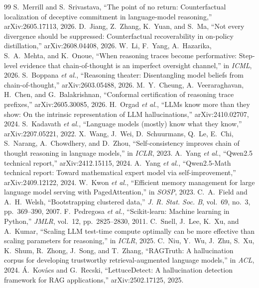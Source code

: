 \begin{thebibliography}{99}
 S.~Merrill and S.~Srivastava, ``The point of no return: Counterfactual localization of deceptive commitment in language-model reasoning,'' arXiv:2605.17113, 2026.
 D.~Jiang, Z.~Zhang, K.~Yuan, and S.~Ma, ``Not every divergence should be suppressed: Counterfactual recoverability in on-policy distillation,'' arXiv:2608.04408, 2026.
 W.~Li, F.~Yang, A.~Hazarika, S.~A.~Mehta, and K.~Onoue, ``When reasoning traces become performative: Step-level evidence that chain-of-thought is an imperfect oversight channel,'' in \emph{ICML}, 2026.
 S.~Boppana \emph{et al.}, ``Reasoning theater: Disentangling model beliefs from chain-of-thought,'' arXiv:2603.05488, 2026.
 M.~Y.~Cheung, A.~Veeraraghavan, H.~Chen, and G.~Balakrishnan, ``Conformal certification of reasoning trace prefixes,'' arXiv:2605.30085, 2026.
 H.~Orgad \emph{et al.}, ``LLMs know more than they show: On the intrinsic representation of LLM hallucinations,'' arXiv:2410.02707, 2024.
 S.~Kadavath \emph{et al.}, ``Language models (mostly) know what they know,'' arXiv:2207.05221, 2022.
 X.~Wang, J.~Wei, D.~Schuurmans, Q.~Le, E.~Chi, S.~Narang, A.~Chowdhery, and D.~Zhou, ``Self-consistency improves chain of thought reasoning in language models,'' in \emph{ICLR}, 2023.
 A.~Yang \emph{et al.}, ``Qwen2.5 technical report,'' arXiv:2412.15115, 2024.
 A.~Yang \emph{et al.}, ``Qwen2.5-Math technical report: Toward mathematical expert model via self-improvement,'' arXiv:2409.12122, 2024.
 W.~Kwon \emph{et al.}, ``Efficient memory management for large language model serving with PagedAttention,'' in \emph{SOSP}, 2023.
 C.~A.~Field and A.~H.~Welsh, ``Bootstrapping clustered data,'' \emph{J. R. Stat. Soc. B}, vol.~69, no.~3, pp.~369--390, 2007.
 F.~Pedregosa \emph{et al.}, ``Scikit-learn: Machine learning in Python,'' \emph{JMLR}, vol.~12, pp.~2825--2830, 2011.
 C.~Snell, J.~Lee, K.~Xu, and A.~Kumar, ``Scaling LLM test-time compute optimally can be more effective than scaling parameters for reasoning,'' in \emph{ICLR}, 2025.
 C.~Niu, Y.~Wu, J.~Zhu, S.~Xu, K.~Shum, R.~Zhong, J.~Song, and T.~Zhang, ``RAGTruth: A hallucination corpus for developing trustworthy retrieval-augmented language models,'' in \emph{ACL}, 2024.
 \'A.~Kov\'acs and G.~Recski, ``LettuceDetect: A hallucination detection framework for RAG applications,'' arXiv:2502.17125, 2025.

\end{thebibliography}
